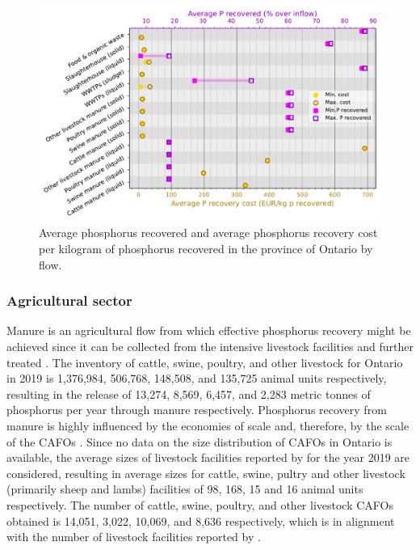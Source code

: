\documentclass[authoryear]{elsarticle}
\begin{document}
\begin{figure}[H]
	\centering
	\includegraphics[width=0.85\linewidth, trim={0cm 0cm 0cm 0cm},clip]{Figures/Results_PlotSummarySpecific.pdf} 
	\caption{Average phosphorus recovered and average phosphorus recovery cost per kilogram of phosphorus recovered in the province of Ontario by flow.}
	\label{fig:Results_PlotSummarySpecific}
\end{figure}

\subsubsection{Agricultural sector}
Manure is an agricultural flow from which effective phosphorus recovery might be achieved since it can be collected from the intensive livestock facilities and further treated \citep{schoumans2010phosphorus}. The inventory of cattle, swine, poultry, and other livestock for Ontario in 2019 is 1,376,984, 506,768, 148,508, and 135,725 animal units respectively, resulting in the release of 13,274, 8,569, 6,457, and 2,283 metric tonnes of phosphorus per year through manure respectively.
Phosphorus recovery from manure is highly influenced by the economies of scale and, therefore, by the scale of the CAFOs \citep{martin2021geospatial}. Since no data on the size distribution of CAFOs in Ontario is available, the average sizes of livestock facilities reported by \citet{CAFOSAvgSize} for the year 2019 are considered, resulting in average sizes for cattle, swine, pultry and other livestock (primarily sheep and lambs) facilities of 98, 168, 15 and 16 animal units respectively. The number of cattle, swine, poultry, and other livestock CAFOs obtained is 14,051, 3,022, 10,069, and 8,636 respectively, which is in alignment with the number of livestock facilities reported by \citet{CAFOSAvgSizeAndNumber}.
\end{document}
